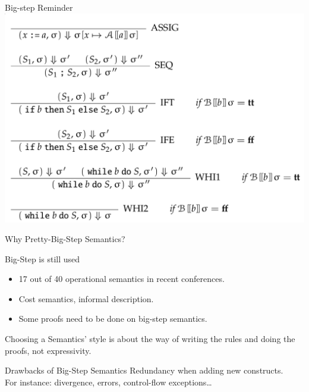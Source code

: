 \documentclass[page number,dvipsnames]{beamer}
\begin{document}
\begin{frame}{Big-step Reminder}
  \center
  \includegraphics[scale=0.2]{bigstep.png}
\end{frame}


\begin{frame}{Why Pretty-Big-Step Semantics?}
  \begin{block}{Big-Step is still used}
    \begin{itemize}
    \item 17 out of 40 operational semantics in recent conferences.
    \item Cost semantics, informal description.
    \item Some proofs need to be done on big-step semantics.
    \end{itemize}
  \end{block}
  Choosing a Semantics' style is about the way of writing the rules and doing the proofs, not expressivity.
  \vfill
  \vfill
  \begin{alertblock}{Drawbacks of Big-Step Semantics}
    Redundancy when adding new constructs.\\
    For instance: divergence, errors, control-flow exceptions\dots
  \end{alertblock}
\end{frame}
\end{document}
